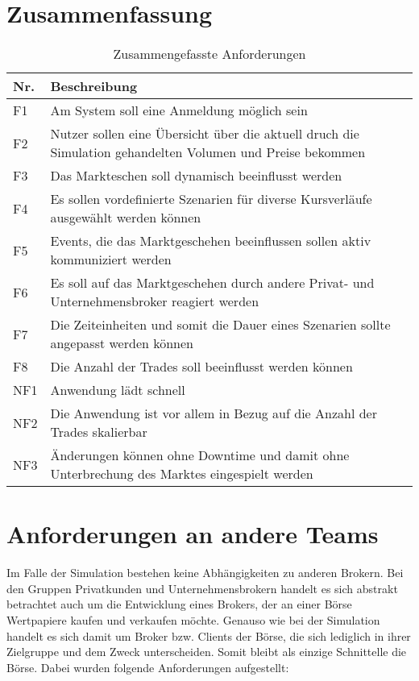 \section{Zusammenfassung}
	\begin{table}[ht!]
		\centering
		\begin{tabularx}{.8\textwidth}{l|X}
			Nr.     & Beschreibung                              \\\hline
			F1      & Am System soll eine Anmeldung möglich sein                  \\
			F2      & Nutzer sollen eine Übersicht über die aktuell druch die Simulation gehandelten Volumen und Preise bekommen  \\
			F3      & Das Markteschen soll dynamisch beeinflusst werden   \\
			F4      & Es sollen vordefinierte Szenarien für diverse Kursverläufe ausgewählt werden können \\
			F5      & Events, die das Marktgeschehen beeinflussen sollen aktiv kommuniziert werden  \\
			F6      & Es soll auf das Marktgeschehen durch andere Privat- und Unternehmensbroker reagiert werden  \\
			F7      & Die Zeiteinheiten und somit die Dauer eines Szenarien sollte angepasst werden können  \\
			F8		& Die Anzahl der Trades soll beeinflusst werden können \\\hline
			NF1     & Anwendung lädt schnell                    \\
			NF2     & Die Anwendung ist vor allem in Bezug auf die Anzahl der Trades skalierbar                \\
			NF3     & Änderungen können ohne Downtime und damit ohne Unterbrechung des Marktes eingespielt werden   \\
		\end{tabularx}
		\caption{Zusammengefasste Anforderungen}
		\label{tab:anforderungen}
	\end{table}

\section{Anforderungen an andere Teams}\label{sec:otherTeams}
	Im Falle der Simulation bestehen keine Abhängigkeiten zu anderen Brokern. Bei den Gruppen Privatkunden und Unternehmensbrokern handelt es sich abstrakt betrachtet auch um die Entwicklung eines Brokers, der an einer Börse Wertpapiere kaufen und verkaufen möchte. Genauso wie bei der Simulation handelt es sich damit um Broker bzw. Clients der Börse, die sich lediglich in ihrer Zielgruppe und dem Zweck unterscheiden. Somit bleibt als einzige Schnittelle die Börse. Dabei wurden folgende Anforderungen aufgestellt:
	
